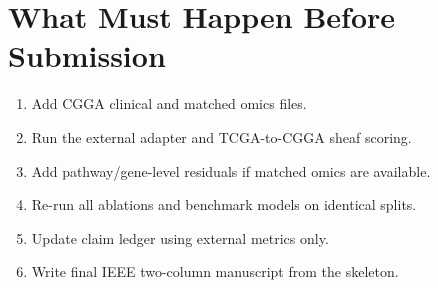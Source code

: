 \documentclass[11pt]{article}
\begin{document}
\section{What Must Happen Before Submission}
\begin{enumerate}[leftmargin=*]
\item Add CGGA clinical and matched omics files.
\item Run the external adapter and TCGA-to-CGGA sheaf scoring.
\item Add pathway/gene-level residuals if matched omics are available.
\item Re-run all ablations and benchmark models on identical splits.
\item Update claim ledger using external metrics only.
\item Write final IEEE two-column manuscript from the skeleton.
\end{enumerate}
\end{document}
